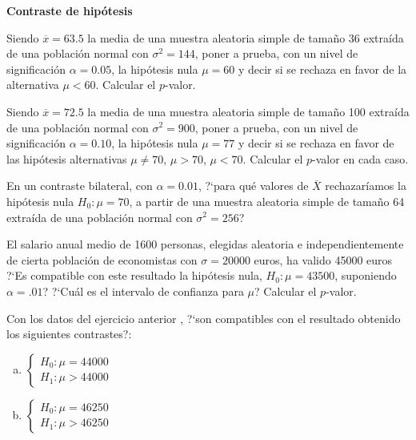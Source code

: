 \documentclass[12pt]{article}
\begin{document}
\textbf{Contraste de hipótesis}

\begin{prob}%
Siendo $\overline{x}=63.5$ la media de una muestra aleatoria simple de tamaño 36 extraída
de una población normal con $\sigma^2=144$, poner
 a prueba, con un nivel de significación $\alpha=0.05$, la hipótesis
 nula $\mu=60$ y decir si se rechaza en favor de la alternativa
 $\mu<60$. Calcular el $p$-valor.
\end{prob}

\begin{prob}%
Siendo $\overline{x}=72.5$ la media de una muestra aleatoria simple de tamaño 100 extraída
de una población normal con $\sigma^2=900$, poner
 a prueba, con un nivel de significación $\alpha=0.10$, la hipótesis
 nula $\mu=77$ y decir si se rechaza en favor de las hipótesis
 alternativas
 $\mu\not= 70$, $ \mu>70$, $\mu<70$. Calcular el $p$-valor en cada caso.
\end{prob}


\begin{prob}%
    En un contraste bilateral, con $\alpha=0.01$, ?`para qué valores
    de $\overline{X}$ rechazaríamos  la hipótesis nula $H_{0}:\mu=70$, a
    partir de una muestra aleatoria simple de tamaño 64 extraída de una
    población normal con $\sigma^2=256$?
\end{prob}

\begin{prob}%
    El salario anual medio de 1600 personas, elegidas aleatoria e
    independientemente de cierta población de economistas con $\sigma=20000$ euros, ha
    valido 45000 euros  ?`Es compatible  con este resultado la hipótesis
    nula, $H_{0}:\mu=43500$, suponiendo $\alpha=.01$? ?`Cuál es el intervalo
    de confianza para $\mu$? Calcular el $p$-valor.
\end{prob}

\begin{prob}%
    Con los datos del ejercicio anterior , ?`son compatibles con el
    resultado obtenido los siguientes contrastes?:
    \begin{enumerate}[a)]
        \item $\left\{\begin{array}{ll} H_{0}:\mu=44000\\
        H_{1}:\mu>44000\end{array}\right.$
        \item $\left\{\begin{array}{ll} H_{0}:\mu=46250\\
        H_{1}:\mu>46250\end{array}\right.$
        \end{enumerate}
\end{prob}
\end{document}

